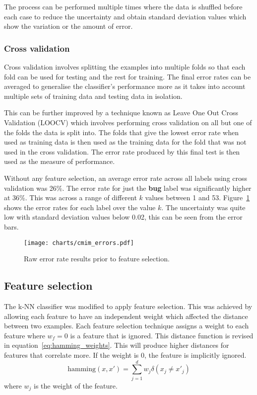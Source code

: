 The process can be performed multiple times where the data is shuffled before each case to reduce the uncertainty and obtain
standard deviation values which show the variation or the amount of error.

\subsubsection{Cross validation}
Cross validation involves splitting the examples into multiple folds so that each fold can be used for testing and the rest for
training. The final error rates can be averaged to generalise the classifier's performance more as it takes into account
multiple sets of training data and testing data in isolation.

This can be further improved by a technique known as Leave One Out Cross Validation (LOOCV) which involves performing cross
validation on all but one of the folds the data is split into. The folds that give the lowest error rate when used as training
data is then used as the training data for the fold that was not used in the cross validation. The error rate produced by this
final test is then used as the measure of performance.

Without any feature selection, an average error rate across all labels using cross validation was 26\%. The error rate for just
the \textbf{bug} label was significantly higher at 36\%. This was across a range of different $k$ values between 1 and 53.
Figure~\ref{fig:raw_errors} shows the error rates for each label over the value $k$. The uncertainty was quite low with
standard deviation values below 0.02, this can be seen from the error bars.

\begin{figure}[h]
    \centering
    \texttt{[image: charts/cmim\_errors.pdf]}
    \caption{Raw error rate results prior to feature selection.}
    \label{fig:raw_errors}
\end{figure}

\subsection{Feature selection}
The k-NN classifier was modified to apply feature selection. This was achieved by allowing each feature to have an independent
weight which affected the distance between two examples. Each feature selection technique assigns a weight to each feature where
$w_f = 0$ is a feature that is ignored. This distance function is revised in equation~\ref{eq:hamming_weights}. This will
produce higher distances for features that correlate more. If the weight is 0, the feature is implicitly ignored.
\begin{equation}
    \label{eq:hamming_weights}
    \mathrm{hamming}(x,x') = \sum^d_{j=1} w_{j} \delta (x_{j} \neq x'_{j})
\end{equation}
where $w_{j}$ is the weight of the feature.

